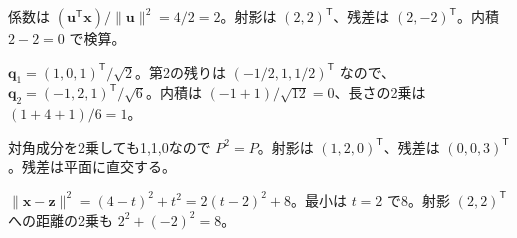 \documentclass[11pt]{article}
\begin{document}

\problem[直線への射影]
\begin{ans}
係数は $(\boldsymbol u^{\mathsf T}\boldsymbol x)/\|\boldsymbol u\|^2=4/2=2$。射影は $(2,2)^{\mathsf T}$、残差は $(2,-2)^{\mathsf T}$。内積 $2-2=0$ で検算。
\end{ans}

\problem[正規直交化]
\begin{ans}
$\boldsymbol q_1=(1,0,1)^{\mathsf T}/\sqrt2$。第2の残りは $(-1/2,1,1/2)^{\mathsf T}$ なので、$\boldsymbol q_2=(-1,2,1)^{\mathsf T}/\sqrt6$。内積は $(-1+1)/\sqrt{12}=0$、長さの2乗は $(1+4+1)/6=1$。
\end{ans}
\newpage

\problem[射影行列]
\begin{ans}
対角成分を2乗しても1,1,0なので $P^2=P$。射影は $(1,2,0)^{\mathsf T}$、残差は $(0,0,3)^{\mathsf T}$。残差は平面に直交する。
\end{ans}

\problem[最短距離]
\begin{ans}
$\|\boldsymbol x-\boldsymbol z\|^2=(4-t)^2+t^2=2(t-2)^2+8$。最小は $t=2$ で8。射影 $(2,2)^{\mathsf T}$ への距離の2乗も $2^2+(-2)^2=8$。
\end{ans}
\end{document}
